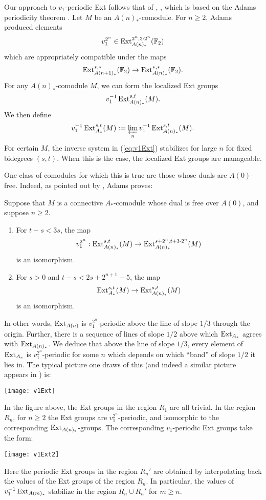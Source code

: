 Our approach to $v_1$-periodic Ext follows that of  \cite{MahowaldShick}, \cite{DavisMahowaldv1}, which is based on the Adams periodicity theorem \cite{AdamsP}.  Let $M$ be an $A(n)_*$-comodule.  For $n \ge 2$, Adams produced elements
$$ v_1^{2^n} \in \operatorname{Ext}^{2^n, 3\cdot 2^n}_{A(n)_*}(\mathbb{F}_2) $$
which are appropriately compatible under the maps
$$ \operatorname{Ext}^{*,*}_{A(n+1)_*}(\mathbb{F}_2) \rightarrow \operatorname{Ext}^{*,*}_{A(n)_*}(\mathbb{F}_2). $$
For any $A(n)_*$-comodule $M$, we can form the localized Ext groups
$$ v_1^{-1}\operatorname{Ext}^{s,t}_{A(n)_*}(M). $$
We then define
\begin{equation}\label{eq:v1Ext} v_1^{-1}\operatorname{Ext}^{s,t}_{A_*}(M) := \varprojlim_n v_1^{-1}\operatorname{Ext}^{s,t}_{A(n)_*}(M).
\end{equation}
For certain $M$, the inverse system in (\ref{eq:v1Ext}) stabilizes for large $n$ for fixed bidegrees $(s,t)$. When this is the case, the localized Ext groups are manageable.


One class of comodules for which this is true are those whose duals are $A(0)$-free.  Indeed, as pointed out by \cite{DavisMahowaldv1}, Adams proves:

\begin{thm}\label{thm:AdamsP}
Suppose that $M$ is a connective $A_*$-comodule whose dual is free over $A(0)$, and suppose $n \ge 2$. 
\begin{enumerate}
\item For $t-s < 3s$, the map
$$ v_1^{2^n}: \operatorname{Ext}^{s,t}_{A(n)_*}(M) \rightarrow \operatorname{Ext}^{s+2^n, t+3\cdot 2^n}_{A(n)_*}(M) $$
is an isomorphism.

\item For $s > 0$ and $t-s < 2s + 2^{n+1} - 5$, the map
$$ \operatorname{Ext}_{A_*}^{s,t}(M) \rightarrow \operatorname{Ext}_{A(n)_*}^{s,t}(M) $$
is an isomorphism.
\end{enumerate}
\end{thm}

In other words, $\operatorname{Ext}_{A(n)}$ is $v_1^{2^n}$-periodic above the line of slope $1/3$ through the origin. Further, there is a sequence of lines of slope $1/2$ above which $\operatorname{Ext}_{A_*}$ agrees with $\operatorname{Ext}_{A(n)_*}$. We deduce that above the line of slope $1/3$, every element of $\operatorname{Ext}_{A_*}$ is $v_1^{2^n}$-periodic for some $n$ which depends on which ``band'' of slope $1/2$ it lies in. The typical picture one draws of this (and indeed a similar picture appears in \cite{DavisMahowaldv1}) is:


\begin{center}
\texttt{[image: v1Ext]}
\end{center}
In the figure above, the Ext groups in the region $R_1$ are all trivial.  In the region $R_n$, for $n \ge 2$ the Ext groups are $v_1^{2^n}$-periodic, and isomorphic to the corresponding $\operatorname{Ext}_{A(n)_*}$-groups.  The corresponding $v_1$-periodic Ext groups take the form:
\begin{center}
\texttt{[image: v1Ext2]}
\end{center}
Here the periodic Ext groups in the region $R_n'$ are obtained by interpolating back the values of the Ext groups of the region $R_n$. In particular, the values of $v_1^{-1}\operatorname{Ext}_{A(m)_*}$ stabilize in the region $R_n \cup R_n'$ for $m \ge n$.


